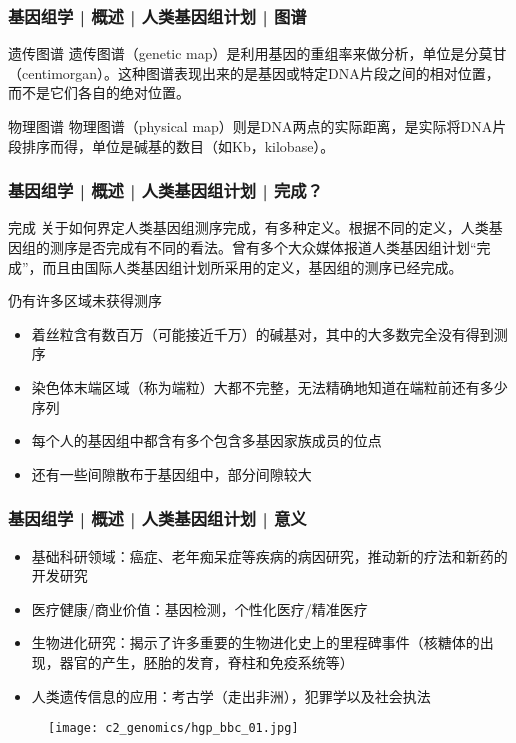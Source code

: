 \begin{frame}
  \frametitle{基因组学 | 概述 | 人类基因组计划 | 图谱}
  \begin{block}{遗传图谱}
遗传图谱（genetic map）是利用基因的重组率来做分析，单位是分莫甘（centimorgan）。这种图谱表现出来的是基因或特定DNA片段之间的相对位置，而不是它们各自的绝对位置。
  \end{block}
  \pause
  \begin{block}{物理图谱}
物理图谱（physical map）则是DNA两点的实际距离，是实际将DNA片段排序而得，单位是碱基的数目（如Kb，kilobase）。
  \end{block}
\end{frame}

\begin{frame}
  \frametitle{基因组学 | 概述 | 人类基因组计划 | 完成？}
  \begin{block}{完成}
关于如何界定人类基因组测序完成，有多种定义。根据不同的定义，人类基因组的测序是否完成有不同的看法。曾有多个大众媒体报道人类基因组计划“完成”，而且由国际人类基因组计划所采用的定义，基因组的测序已经完成。
  \end{block}
  \pause
  \begin{block}{仍有许多区域未获得测序}
    \begin{itemize}
      \item 着丝粒含有数百万（可能接近千万）的碱基对，其中的大多数完全没有得到测序
      \item 染色体末端区域（称为端粒）大都不完整，无法精确地知道在端粒前还有多少序列
      \item 每个人的基因组中都含有多个包含多基因家族成员的位点
      \item 还有一些间隙散布于基因组中，部分间隙较大
    \end{itemize}
  \end{block}
\end{frame}

\begin{frame}
  \frametitle{基因组学 | 概述 | 人类基因组计划 | 意义}
  \begin{itemize}
    \item 基础科研领域：癌症、老年痴呆症等疾病的病因研究，推动新的疗法和新药的开发研究
    \item 医疗健康/商业价值：基因检测，个性化医疗/精准医疗
    \item 生物进化研究：揭示了许多重要的生物进化史上的里程碑事件（核糖体的出现，器官的产生，胚胎的发育，脊柱和免疫系统等）
    \item 人类遗传信息的应用：考古学（走出非洲），犯罪学以及社会执法
  \end{itemize}
  \begin{figure}
    \centering
    \texttt{[image: c2\_genomics/hgp\_bbc\_01.jpg]}
  \end{figure}
\end{frame}

